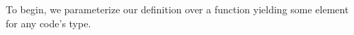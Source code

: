 To begin, we parameterize our definition over a function
yielding some element for any code's type.
\begin{code}%
%
\>[2]\AgdaSpace{}%
\AgdaSpace{}%
\AgdaSymbol{\{}\AgdaSymbol{\}}\<%
\\
\>[2][@{}l@{\AgdaIndent{0}}]%
\>[4]\AgdaSymbol{(}\AgdaSpace{}%
\AgdaSymbol{:}\AgdaSpace{}%
\AgdaSpace{}%
\AgdaSymbol{)}\<%
\\
%
\>[4]\AgdaSymbol{(}\AgdaSpace{}%
\AgdaSymbol{:}\AgdaSpace{}%
\AgdaSpace{}%
\AgdaSpace{}%
\AgdaSpace{}%
\AgdaSymbol{)}\<%
\\
%
\>[4]\AgdaSymbol{(}\AgdaSpace{}%
\AgdaSymbol{:}\AgdaSpace{}%
\AgdaSymbol{)}\AgdaSpace{}%
\AgdaSymbol{(}\AgdaSpace{}%
\AgdaSymbol{:}\AgdaSpace{}%
\AgdaSpace{}%
\AgdaSymbol{(}\AgdaSpace{}%
\AgdaSymbol{)}\AgdaSpace{}%
\AgdaSpace{}%
\AgdaSymbol{)}\<%
\\
%
\>[4]\AgdaSymbol{(}\AgdaSpace{}%
\AgdaSymbol{:}\AgdaSpace{}%
\AgdaSymbol{(}\AgdaSpace{}%
\AgdaSymbol{:}\AgdaSpace{}%
\AgdaSymbol{)}\AgdaSpace{}%
\AgdaSpace{}%
\AgdaSpace{}%
\AgdaSymbol{)}\AgdaSpace{}%
\<%
\end{code}
